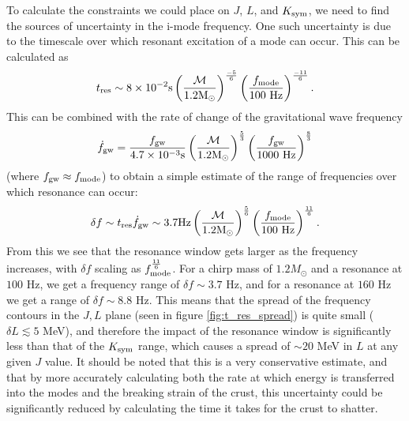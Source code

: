 \documentclass[fleqn,usenatbib]{mnras}
\begin{document}

To calculate the constraints we could place on $J$, $L$, and $K_{\rm sym}$, we need to find the sources of uncertainty in the i-mode frequency. One such uncertainty is due to the timescale over which resonant excitation of a mode can occur. This can be calculated as \cite{tsang2012resonant}
\begin{align}
t_{\rm res}\sim 8\times10^{-2}\text{s}\left(\frac{\mathcal{M}}{1.2\text{M}_{\odot}}\right)^{\frac{-5}{6}}\left(\frac{f_{\rm mode}}{100 \text{ Hz}}\right)^{\frac{-11}{6}}.
\label{eq:res_timescale}    
\end{align}
\noindent This can be combined with the rate of change of the gravitational wave frequency
\begin{align}
\Dot{f}_{\rm gw}=\frac{f_{\rm gw}}{4.7\times10^{-3}\text{s}}\left(\frac{\mathcal{M}}{1.2\text{M}_{\odot}}\right)^{\frac{5}{3}}\left(\frac{f_{\rm gw}}{1000 \text{ Hz}}\right)^{\frac{8}{3}}
\label{eq:df_GW/dt}    
\end{align}
\noindent (where $f_{\rm gw}\approx f_{\rm mode}$) to obtain a simple estimate of the range of frequencies over which resonance can occur:
\begin{align}
\delta f\sim t_{\rm res}\Dot{f}_{\rm gw}\sim3.7\text{Hz}\left(\frac{\mathcal{M}}{1.2\text{M}_{\odot}}\right)^{\frac{5}{6}}\left(\frac{f_{\rm mode}}{100 \text{ Hz}}\right)^{\frac{11}{6}}.
\label{eq:freq_spread}    
\end{align}
\noindent From this we see that the resonance window gets larger as the frequency increases, with $\delta f$ scaling as $f_{\rm mode}^{\frac{11}{6}}$. For a chirp mass of $1.2M_{\odot}$ and a resonance at $100$ Hz, we get a frequency range of $\delta f\sim 3.7$ Hz, and for a resonance at $160$ Hz we get a range of $\delta f\sim 8.8$ Hz. This means that the spread of the frequency contours in the $J,L$ plane (seen in figure \ref{fig:t_res_spread}) is quite small ($\delta L\lesssim 5$ MeV), and therefore the impact of the resonance window is significantly less than that of the $K_{\rm sym}$ range, which causes a spread of $\sim 20$ MeV in $L$ at any given $J$ value. It should be noted that this is a very conservative estimate, and that by more accurately calculating both the rate at which energy is transferred into the modes and the breaking strain of the crust, this uncertainty could be significantly reduced by calculating the time it takes for the crust to shatter.
\end{document}
